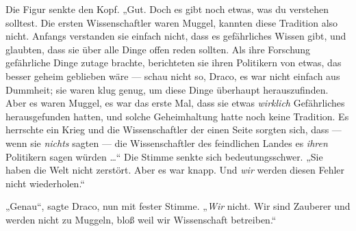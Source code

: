 Die Figur senkte den Kopf.
„Gut. Doch es gibt noch etwas, was du verstehen solltest. Die ersten Wissenschaftler waren Muggel, kannten diese Tradition also nicht. Anfangs verstanden sie einfach nicht, dass es gefährliches Wissen gibt, und glaubten, dass sie über alle Dinge offen reden sollten. Als ihre Forschung gefährliche Dinge zutage brachte, berichteten sie ihren Politikern von etwas, das besser geheim geblieben wäre — schau nicht so, Draco, es war nicht einfach aus Dummheit; sie waren klug genug, um diese Dinge überhaupt herauszufinden. Aber es waren Muggel, es war das erste Mal, dass sie etwas \emph{wirklich} Gefährliches herausgefunden hatten, und solche Geheimhaltung hatte noch keine Tradition. Es herrschte ein Krieg und die Wissenschaftler der einen Seite sorgten sich, dass — wenn sie \emph{nichts} sagten — die Wissenschaftler des feindlichen Landes es \emph{ihren} Politikern sagen würden …“ Die Stimme senkte sich bedeutungsschwer.
„Sie haben die Welt nicht zerstört. Aber es war knapp. Und \emph{wir} werden diesen Fehler nicht wiederholen.“

„Genau“, sagte Draco, nun mit fester Stimme.
„\emph{Wir} nicht. Wir sind Zauberer und werden nicht zu Muggeln, bloß weil wir Wissenschaft betreiben.“

